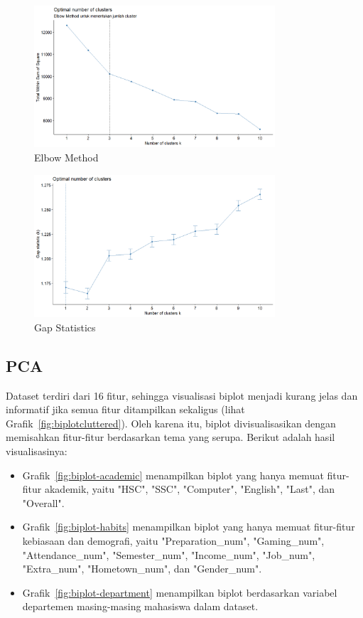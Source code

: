 \begin{figure}[!htpb]
    \centering
    \includegraphics[width=0.8\textwidth]{figures/elbowmethod.png}
    \caption{Elbow Method}
    \label{fig:elbowmethod}
\end{figure}

\begin{figure}[!htpb]
    \centering
    \includegraphics[width=0.8\textwidth]{figures/gapstat.png}
    \caption{Gap Statistics}
    \label{fig:gapstat}
\end{figure}
\pagebreak

\subsection{PCA}
Dataset terdiri dari 16 fitur, sehingga visualisasi biplot menjadi kurang jelas dan informatif jika semua fitur ditampilkan sekaligus (lihat Grafik~\ref{fig:biplotcluttered}). Oleh karena itu, biplot divisualisasikan dengan memisahkan fitur-fitur berdasarkan tema yang serupa. Berikut adalah hasil visualisasinya:
\begin{itemize}
    \item Grafik~\ref{fig:biplot-academic} menampilkan biplot yang hanya memuat fitur-fitur akademik, yaitu "HSC", "SSC", "Computer", "English", "Last", dan "Overall".
    \item Grafik~\ref{fig:biplot-habits} menampilkan biplot yang hanya memuat fitur-fitur kebiasaan dan demografi, yaitu "Preparation\_num", "Gaming\_num", "Attendance\_num", "Semester\_num", "Income\_num", "Job\_num", "Extra\_num", "Hometown\_num", dan "Gender\_num".
    \item Grafik~\ref{fig:biplot-department} menampilkan biplot berdasarkan variabel departemen masing-masing mahasiswa dalam dataset.
\end{itemize}

